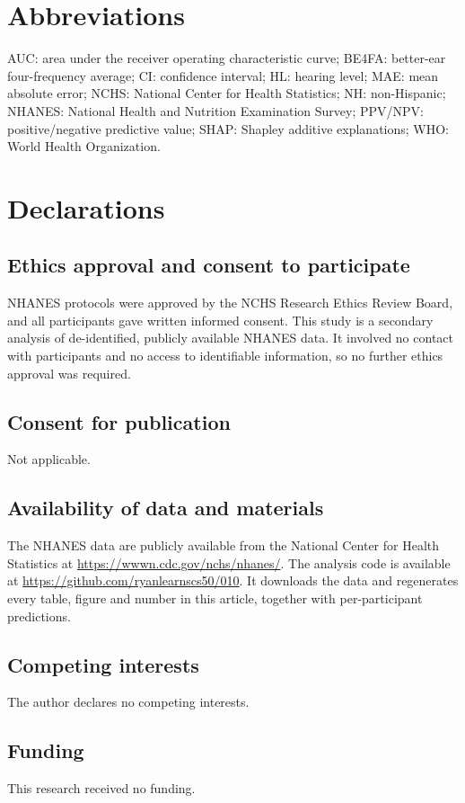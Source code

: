\documentclass[11pt]{article}
\begin{document}
\section*{Abbreviations}
AUC: area under the receiver operating characteristic curve; BE4FA: better-ear four-frequency average; CI: confidence interval; HL: hearing level; MAE: mean absolute error; NCHS: National Center for Health Statistics; NH: non-Hispanic; NHANES: National Health and Nutrition Examination Survey; PPV/NPV: positive/negative predictive value; SHAP: Shapley additive explanations; WHO: World Health Organization.

\section*{Declarations}
\subsection*{Ethics approval and consent to participate}
NHANES protocols were approved by the NCHS Research Ethics Review Board, and all participants gave written informed consent. This study is a secondary analysis of de-identified, publicly available NHANES data. It involved no contact with participants and no access to identifiable information, so no further ethics approval was required.

\subsection*{Consent for publication}
Not applicable.

\subsection*{Availability of data and materials}
The NHANES data are publicly available from the National Center for Health Statistics at \url{https://wwwn.cdc.gov/nchs/nhanes/}. The analysis code is available at \url{https://github.com/ryanlearnscs50/010}. It downloads the data and regenerates every table, figure and number in this article, together with per-participant predictions.

\subsection*{Competing interests}
The author declares no competing interests.

\subsection*{Funding}
This research received no funding.
\end{document}
